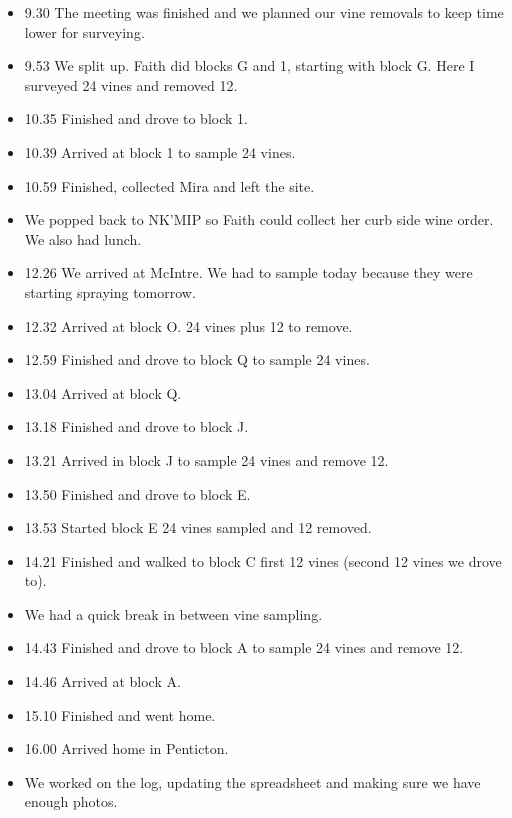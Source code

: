 \documentclass[11pt,letter]{article}
\newenvironment{smitemize}{
\begin{itemize}
  \setlength{\itemsep}{0pt}
  \setlength{\parskip}{0.8pt}
  \setlength{\parsep}{0pt}}
{\end{itemize}
}
\begin{document}
\begin{smitemize}
\item 9.30 The meeting was finished and we planned our vine removals to keep time lower for surveying.
\item 9.53 We split up. Faith did blocks G and 1, starting with block G. Here I surveyed 24 vines and removed 12.  
\item 10.35 Finished and drove to block 1.
\item 10.39 Arrived at block 1 to sample 24 vines.
\item 10.59 Finished, collected Mira and left the site.
\item We popped back to NK'MIP so Faith could collect her curb side wine order. We also had lunch. 
\item 12.26 We arrived at McIntre. We had to sample today because they were starting spraying tomorrow.
\item 12.32 Arrived at block O. 24 vines plus 12 to remove.
\item 12.59 Finished and drove to block Q to sample 24 vines. 
\item 13.04 Arrived at block Q.
\item 13.18 Finished and drove to block J.
\item 13.21 Arrived in block J to sample 24 vines and remove 12.
\item 13.50 Finished and drove to block E.
\item 13.53 Started block E 24 vines sampled and 12 removed.
\item 14.21 Finished and walked to block C first 12 vines (second 12 vines we drove to).
\item We had a quick break in between vine sampling.
\item 14.43 Finished and drove to block A to sample 24 vines and remove 12.
\item 14.46 Arrived at block A.
\item 15.10 Finished and went home.
\item 16.00 Arrived home in Penticton.
\item We worked on the log, updating the spreadsheet and making sure we have enough photos.  
\end{smitemize}
\end{document}
